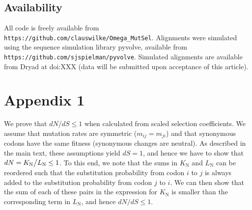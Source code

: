 \documentclass[11pt]{article}
\begin{document}
\subsection*{Availability}
All code is freely available from \\ \texttt{https://github.com/clauswilke/Omega\_MutSel}. Alignments were simulated using the sequence simulation library pyvolve, available from  \\ \texttt{https://github.com/sjspielman/pyvolve}. Simulated alignments are available from Dryad at doi:XXX (data will be submitted upon acceptance of this article).



\section*{Appendix 1}
We prove that $dN/dS \leq 1$ when calculated from scaled selection coefficients. We assume that mutation rates are symmetric ($m_{ij} = m_{ji}$) and that synonymous codons have the same fitness (synonymous changes are neutral). As described in the main text, these assumptions yield $dS = 1$, and hence we have to show that $dN = K_\text{N}\big{/}L_\text{N} \leq 1$. To this end, we note that the sums in $K_\text{N}$ and $L_\text{N}$ can be reordered such that the substitution probability from codon $i$ to $j$ is always added to the substitution probability from codon $j$ to $i$. We can then show that the sum of each of these pairs in the expression for $K_\text{N}$ is smaller than the corresponding term in $L_\text{N}$, and hence $dN/dS \leq 1$.
\end{document}
